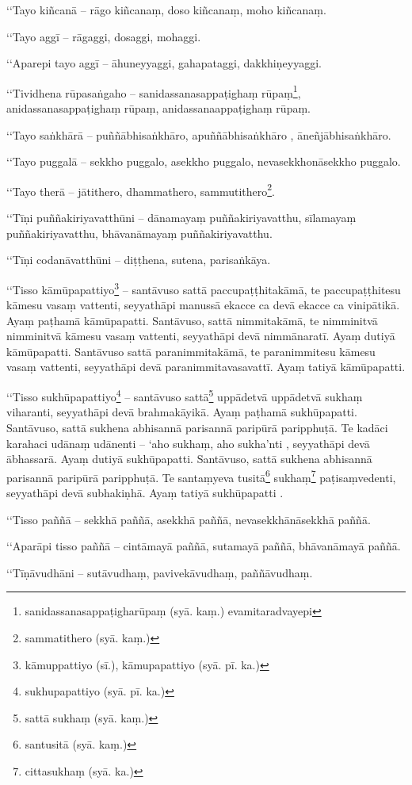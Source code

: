 ‘‘Tayo kiñcanā – rāgo kiñcanaṃ, doso kiñcanaṃ, moho kiñcanaṃ.

‘‘Tayo aggī – rāgaggi, dosaggi, mohaggi.

‘‘Aparepi tayo aggī – āhuneyyaggi, gahapataggi, dakkhiṇeyyaggi.

‘‘Tividhena rūpasaṅgaho – sanidassanasappaṭighaṃ rūpaṃ\footnote{sanidassanasappaṭigharūpaṃ (syā. kaṃ.) evamitaradvayepi}, anidassanasappaṭighaṃ rūpaṃ, anidassanaappaṭighaṃ rūpaṃ.

‘‘Tayo saṅkhārā – puññābhisaṅkhāro, apuññābhisaṅkhāro , āneñjābhisaṅkhāro.

‘‘Tayo puggalā – sekkho puggalo, asekkho puggalo, nevasekkhonāsekkho puggalo.

‘‘Tayo therā – jātithero, dhammathero, sammutithero\footnote{sammatithero (syā. kaṃ.)}.

‘‘Tīṇi puññakiriyavatthūni – dānamayaṃ puññakiriyavatthu, sīlamayaṃ puññakiriyavatthu, bhāvanāmayaṃ puññakiriyavatthu.

‘‘Tīṇi codanāvatthūni – diṭṭhena, sutena, parisaṅkāya.

‘‘Tisso kāmūpapattiyo\footnote{kāmuppattiyo (sī.), kāmupapattiyo (syā. pī. ka.)} – santāvuso sattā paccupaṭṭhitakāmā, te paccupaṭṭhitesu kāmesu vasaṃ vattenti, seyyathāpi manussā ekacce ca devā ekacce ca vinipātikā. Ayaṃ paṭhamā kāmūpapatti. Santāvuso, sattā nimmitakāmā, te nimminitvā nimminitvā kāmesu vasaṃ vattenti, seyyathāpi devā nimmānaratī. Ayaṃ dutiyā kāmūpapatti. Santāvuso sattā paranimmitakāmā, te paranimmitesu kāmesu vasaṃ vattenti, seyyathāpi devā paranimmitavasavattī. Ayaṃ tatiyā kāmūpapatti.

‘‘Tisso sukhūpapattiyo\footnote{sukhupapattiyo (syā. pī. ka.)} – santāvuso sattā\footnote{sattā sukhaṃ (syā. kaṃ.)} uppādetvā uppādetvā sukhaṃ viharanti, seyyathāpi devā brahmakāyikā. Ayaṃ paṭhamā sukhūpapatti. Santāvuso, sattā sukhena abhisannā parisannā paripūrā paripphuṭā. Te kadāci karahaci udānaṃ udānenti – ‘aho sukhaṃ, aho sukha’nti , seyyathāpi devā ābhassarā. Ayaṃ dutiyā sukhūpapatti. Santāvuso, sattā sukhena abhisannā parisannā paripūrā paripphuṭā. Te santaṃyeva tusitā\footnote{santusitā (syā. kaṃ.)} sukhaṃ\footnote{cittasukhaṃ (syā. ka.)} paṭisaṃvedenti, seyyathāpi devā subhakiṇhā. Ayaṃ tatiyā sukhūpapatti .

‘‘Tisso paññā – sekkhā paññā, asekkhā paññā, nevasekkhānāsekkhā paññā.

‘‘Aparāpi tisso paññā – cintāmayā paññā, sutamayā paññā, bhāvanāmayā paññā.

‘‘Tīṇāvudhāni – sutāvudhaṃ, pavivekāvudhaṃ, paññāvudhaṃ.

